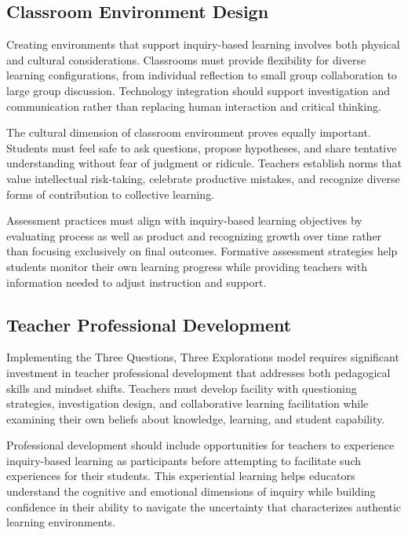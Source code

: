 \documentclass[
  Letterpaper,
]{scrbook}
\begin{document}
\subsection{Classroom Environment
Design}\label{classroom-environment-design}

Creating environments that support inquiry-based learning involves both
physical and cultural considerations. Classrooms must provide
flexibility for diverse learning configurations, from individual
reflection to small group collaboration to large group discussion.
Technology integration should support investigation and communication
rather than replacing human interaction and critical thinking.

The cultural dimension of classroom environment proves equally
important. Students must feel safe to ask questions, propose hypotheses,
and share tentative understanding without fear of judgment or ridicule.
Teachers establish norms that value intellectual risk-taking, celebrate
productive mistakes, and recognize diverse forms of contribution to
collective learning.

Assessment practices must align with inquiry-based learning objectives
by evaluating process as well as product and recognizing growth over
time rather than focusing exclusively on final outcomes. Formative
assessment strategies help students monitor their own learning progress
while providing teachers with information needed to adjust instruction
and support.

\subsection{Teacher Professional
Development}\label{teacher-professional-development}

Implementing the Three Questions, Three Explorations model requires
significant investment in teacher professional development that
addresses both pedagogical skills and mindset shifts. Teachers must
develop facility with questioning strategies, investigation design, and
collaborative learning facilitation while examining their own beliefs
about knowledge, learning, and student capability.

Professional development should include opportunities for teachers to
experience inquiry-based learning as participants before attempting to
facilitate such experiences for their students. This experiential
learning helps educators understand the cognitive and emotional
dimensions of inquiry while building confidence in their ability to
navigate the uncertainty that characterizes authentic learning
environments.
\end{document}
